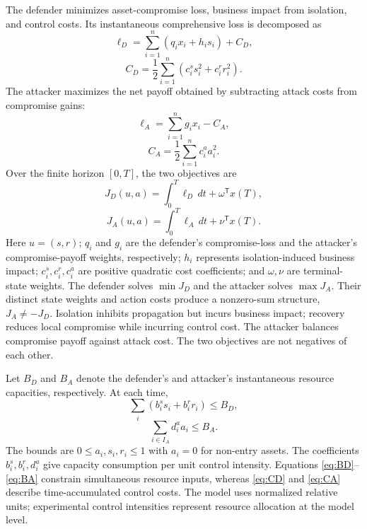 \documentclass[conference,letterpaper]{IEEEtran}
\begin{document}
The defender minimizes asset-compromise loss, business impact from isolation, and control costs. Its instantaneous comprehensive loss is decomposed as
\begin{equation}\label{eq:ellD}
\ell_D=\sum_{i=1}^n(q_i x_i+h_i s_i)+C_D,
\end{equation}
\begin{equation}\label{eq:CD}
C_D=\frac12\sum_{i=1}^n(c_i^s s_i^2+c_i^r r_i^2).
\end{equation}
The attacker maximizes the net payoff obtained by subtracting attack costs from compromise gains:
\begin{equation}\label{eq:ellA}
\ell_A=\sum_{i=1}^n g_i x_i-C_A,
\end{equation}
\begin{equation}\label{eq:CA}
C_A=\frac12\sum_{i=1}^n c_i^a a_i^2.
\end{equation}
Over the finite horizon $[0,T]$, the two objectives are
\begin{equation}\label{eq:JD}
J_D(u,a)=\int_0^T\ell_D\,dt+\omega^{\mathsf T}x(T),
\end{equation}
\begin{equation}\label{eq:JA}
J_A(u,a)=\int_0^T\ell_A\,dt+\nu^{\mathsf T}x(T).
\end{equation}
Here $u=(s,r)$; $q_i$ and $g_i$ are the defender's compromise-loss and the attacker's compromise-payoff weights, respectively; $h_i$ represents isolation-induced business impact; $c_i^s,c_i^r,c_i^a$ are positive quadratic cost coefficients; and $\omega,\nu$ are terminal-state weights. The defender solves $\min J_D$ and the attacker solves $\max J_A$. Their distinct state weights and action costs produce a nonzero-sum structure, $J_A\ne-J_D$. Isolation inhibits propagation but incurs business impact; recovery reduces local compromise while incurring control cost. The attacker balances compromise payoff against attack cost. The two objectives are not negatives of each other.

Let $B_D$ and $B_A$ denote the defender's and attacker's instantaneous resource capacities, respectively. At each time,
\begin{equation}\label{eq:BD}
\sum_i (b_i^s s_i+b_i^r r_i)\leq B_D,
\end{equation}
\begin{equation}\label{eq:BA}
\sum_{i\in I_A}d_i^a a_i\leq B_A.
\end{equation}
The bounds are $0\le a_i,s_i,r_i\le1$ with $a_i=0$ for non-entry assets. The coefficients $b_i^s,b_i^r,d_i^a$ give capacity consumption per unit control intensity. Equations \eqref{eq:BD}--\eqref{eq:BA} constrain simultaneous resource inputs, whereas \eqref{eq:CD} and \eqref{eq:CA} describe time-accumulated control costs. The model uses normalized relative units; experimental control intensities represent resource allocation at the model level.
\end{document}

